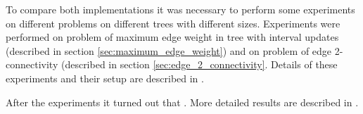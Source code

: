 To compare both implementations it was necessary to perform some experiments on
different problems on different trees with different sizes. Experiments were
performed on problem of {\I maximum edge weight in tree with interval updates}
(described in section \ref{sec:maximum_edge_weight}) and on problem of {\I edge
2-connectivity} (described in section \ref{sec:edge_2_connectivity}. Details of
these experiments and their setup are described in .

After the experiments it turned out that
.
More detailed results are described in .
